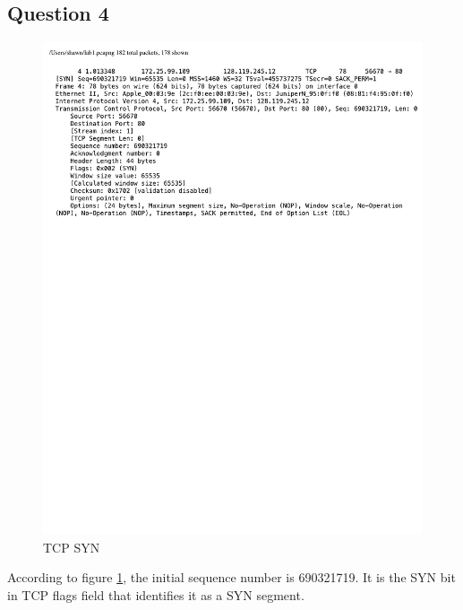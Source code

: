 \documentclass[titlepage, paper=a4, fontsize=11pt]{scrartcl} %
\numberwithin{equation}{section} %
\numberwithin{figure}{section} %
\numberwithin{table}{section} %
\begin{document}
\subsection*{Question 4}
\begin{figure}[!ht]
    \centering
    \includegraphics[width=\textwidth]{images/lab1-q4.pdf}
    \caption{TCP SYN}
    \label{fig:tcp-syn}
\end{figure}
According to figure \ref{fig:tcp-syn}, the initial sequence number is 690321719. It is the SYN bit in TCP flags field that identifies it as a SYN segment. \\
\end{document}
